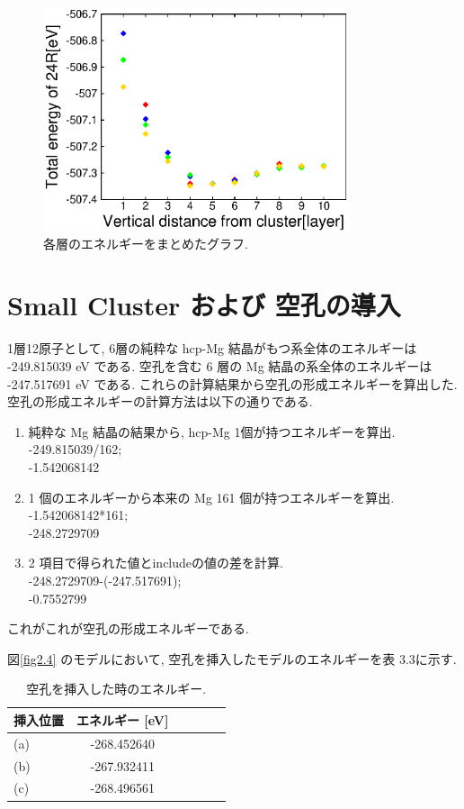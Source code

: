 \begin{figure}[htbp]
	\begin{center}
		\includegraphics[width=90mm]{../result/small_cluster_Alld_color.eps}
		\caption{各層のエネルギーをまとめたグラフ.}
		\label{fig3.3}
	\end{center}
\end{figure}


\section{ Small Cluster および 空孔の導入}
1層12原子として, 6層の純粋な hcp-Mg 結晶がもつ系全体のエネルギーは -249.815039 eV である. 空孔を含む 6 層の Mg 結晶の系全体のエネルギーは -247.517691 eV である. これらの計算結果から空孔の形成エネルギーを算出した. 空孔の形成エネルギーの計算方法は以下の通りである.

\begin{enumerate}
 \item 純粋な Mg 結晶の結果から, hcp-Mg 1個が持つエネルギーを算出.\\ -249.815039/162;\\
-1.542068142
 \item 1 個のエネルギーから本来の Mg 161 個が持つエネルギーを算出.\\
-1.542068142*161;\\
-248.2729709
 \item 2 項目で得られた値とincludeの値の差を計算.\\
-248.2729709-(-247.517691);\\
-0.7552799
\end{enumerate}
これがこれが空孔の形成エネルギーである.


図\ref{fig2.4} のモデルにおいて, 空孔を挿入したモデルのエネルギーを表 3.3に示す.

\begin{table}[htb]
\caption{空孔を挿入した時のエネルギー.}
  \begin{center}
    \begin{tabular}{|l|c|c|c|c|c|} \hline
 挿入位置 & エネルギー [eV] \\ \hline
   (a) & -268.452640\\
\hline
   (b) & -267.932411\\
\hline
   (c) & -268.496561\\
\hline
    \end{tabular}
  \end{center}
\end{table}
